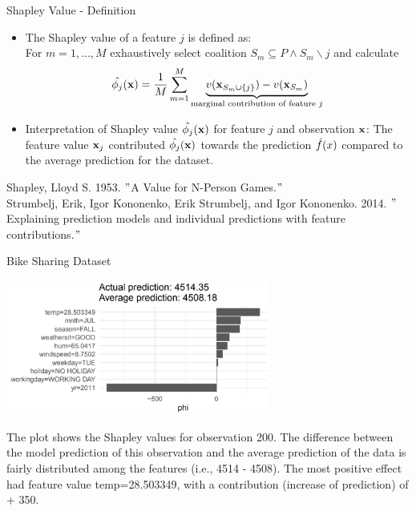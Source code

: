 \documentclass[10pt,compress,t,notes=noshow, xcolor=table]{beamer}
\begin{document}
\begin{vbframe}{Shapley Value - Definition}
\begin{itemize}
  \item The Shapley value of a feature $j$ is defined as:\\
  For $m = 1, \dots, M$ exhaustively select coalition $S_m \subseteq P \land S_m \backslash j$  and calculate
$$ \hat{\phi_{j}}(\mathbf{x}) = \frac{1}{M} \sum_{m=1}^{M} \underbrace{v(\mathbf{x}_{S_m \cup \{j \} }) - v(\mathbf{x}_{S_m})}_{\text{marginal contribution of feature $j$}} $$
\lz
  \item Interpretation of Shapley value $\hat{\phi_{j}}(\mathbf{x})$ for feature $j$ and observation $\mathbf{x}$:
  The feature value $\mathbf{x}_{j}$ contributed $\hat{\phi_{j}}(\mathbf{x})$ towards the prediction $\hat{f}(x)$ compared to the average prediction for the dataset.
\end{itemize}
\lz
\tiny
Shapley, Lloyd S. 1953. $"$A Value for N-Person Games.$"$\\
\vspace{0.2cm}
Strumbelj, Erik, Igor Kononenko, Erik Strumbelj, and Igor Kononenko. 2014. $"$Explaining prediction models and individual predictions with feature contributions.$"$

\end{vbframe}

\begin{vbframe}{Bike Sharing Dataset}

\begin{center}
\includegraphics[width=0.65\textwidth]{figure_man/bike-sharing03.png}
\end{center}

The plot shows the Shapley values for observation 200.
The difference between the model prediction of this observation and the average prediction of the data is fairly distributed among the features (i.e., 4514 - 4508).
The most positive effect had feature value temp=28.503349, with a contribution (increase of prediction) of + 350.
\end{vbframe}


\endlecture
\end{document}
